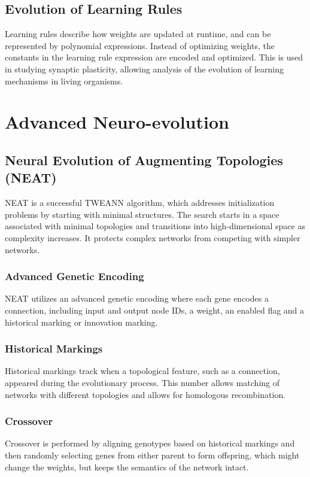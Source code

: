 \subsection*{Evolution of Learning Rules}
Learning rules describe how weights are updated at runtime, and can be represented by polynomial expressions. Instead of optimizing weights, the constants in the learning rule expression are encoded and optimized. This is used in studying synaptic plasticity, allowing analysis of the evolution of learning mechanisms in living organisms.

\section{Advanced Neuro-evolution}

\subsection*{Neural Evolution of Augmenting Topologies (NEAT)}

NEAT is a successful TWEANN algorithm, which addresses initialization problems by starting with minimal structures. The search starts in a space associated with minimal topologies and transitions into high-dimensional space as complexity increases. It protects complex networks from competing with simpler networks.
\subsubsection*{Advanced Genetic Encoding}
NEAT utilizes an advanced genetic encoding where each gene encodes a connection, including input and output node IDs, a weight, an enabled flag and a historical marking or innovation marking.
\subsubsection*{Historical Markings}
Historical markings track when a topological feature, such as a connection, appeared during the evolutionary process. This number allows matching of networks with different topologies and allows for homologous recombination.
\subsubsection*{Crossover}
Crossover is performed by aligning genotypes based on historical markings and then randomly selecting genes from either parent to form offspring, which might change the weights, but keeps the semantics of the network intact.
